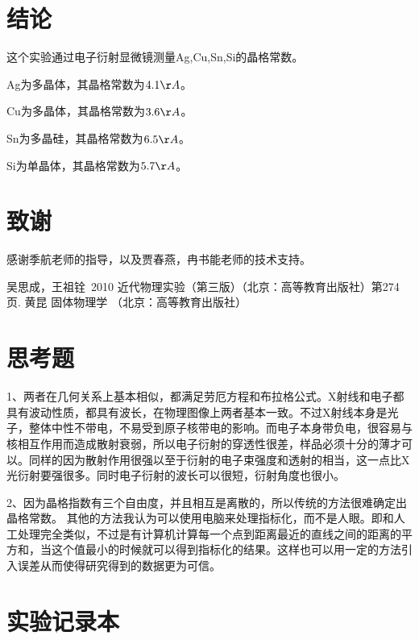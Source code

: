 \documentclass[aps,pre,12pt,preprint,onecolumn,showpacs,showkeys,UTF8]{revtex4-1}
\begin{document}
\section{结论}

这个实验通过电子衍射显微镜测量Ag,Cu,Sn,Si的晶格常数。

Ag为多晶体，其晶格常数为$4.1\AA$。

Cu为多晶体，其晶格常数为$3.6\AA$。

Sn为多晶硅，其晶格常数为$6.5\AA$。

Si为单晶体，其晶格常数为$5.7\AA$。


\section{致谢}
感谢季航老师的指导，以及贾春燕，冉书能老师的技术支持。


\begin{thebibliography}{}
	 吴思成，王祖铨~2010 近代物理实验（第三版）（北京：高等教育出版社）第274页.
	 黄昆 固体物理学 （北京：高等教育出版社）
%
%
\end{thebibliography}

\clearpage
\appendix
\section{思考题}

1、两者在几何关系上基本相似，都满足劳厄方程和布拉格公式。X射线和电子都具有波动性质，都具有波长，在物理图像上两者基本一致。不过X射线本身是光子，整体中性不带电，不易受到原子核带电的影响。而电子本身带负电，很容易与核相互作用而造成散射衰弱，所以电子衍射的穿透性很差，样品必须十分的薄才可以。同样的因为散射作用很强以至于衍射的电子束强度和透射的相当，这一点比X光衍射要强很多。同时电子衍射的波长可以很短，衍射角度也很小。

2、因为晶格指数有三个自由度，并且相互是离散的，所以传统的方法很难确定出晶格常数。
其他的方法我认为可以使用电脑来处理指标化，而不是人眼。即和人工处理完全类似，不过是有计算机计算每一个点到距离最近的直线之间的距离的平方和，当这个值最小的时候就可以得到指标化的结果。这样也可以用一定的方法引入误差从而使得研究得到的数据更为可信。

\section{实验记录本}
\end{document}
